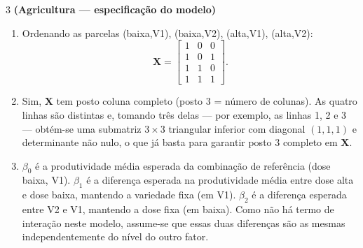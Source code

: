 \documentclass[11pt]{article}
\begin{document}
\begin{questao}{3} \textbf{(Agricultura --- especificação do modelo)}
\end{questao}
\begin{solucao}
\begin{enumerate}[label=(\alph*)]
  \item Ordenando as parcelas (baixa,V1), (baixa,V2), (alta,V1), (alta,V2):
  $$
  \mathbf{X} = \begin{bmatrix} 1 & 0 & 0 \\ 1 & 0 & 1 \\ 1 & 1 & 0 \\ 1 & 1 & 1 \end{bmatrix}.
  $$
  \item Sim, $\mathbf{X}$ tem posto coluna completo (posto 3 = número de colunas). As quatro
    linhas são distintas e, tomando três delas --- por exemplo, as linhas 1, 2 e 3 --- obtém-se
    uma submatriz $3\times 3$ triangular inferior com diagonal $(1,1,1)$ e determinante não nulo,
    o que já basta para garantir posto 3 completo em $\mathbf{X}$.
  \item $\beta_0$ é a produtividade média esperada da combinação de referência (dose baixa,
    V1). $\beta_1$ é a diferença esperada na produtividade média entre dose alta e dose baixa,
    mantendo a variedade fixa (em V1). $\beta_2$ é a diferença esperada entre V2 e V1, mantendo a
    dose fixa (em baixa). Como não há termo de interação neste modelo, assume-se que essas duas
    diferenças são as mesmas independentemente do nível do outro fator.
\end{enumerate}
\end{solucao}
\end{document}
